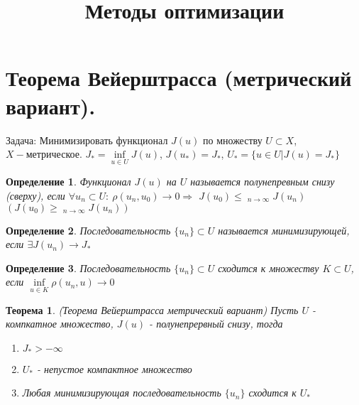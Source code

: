 \documentclass[9pt, a4paper]{extarticle}
\title{Методы оптимизации}
\date{}
\newtheorem*{theorem}{Теорема}
\newtheorem*{definition}{Определение}
\DeclareMathOperator*\lowlim{\underline{lim}}
\DeclareMathOperator*\uplim{\overline{lim}}
\begin{document}
	\maketitle
	\section{Теорема Вейерштрасса (метрический вариант).}
	Задача: Минимизировать функционал $J(u)$ по множеству $U \subset X$, $X - \text{метрическое}$. \newline
	$J_* = \inf\limits_{u \in U} J(u)$, $J(u_*) = J_*$, $U_* = \{u \in U \vert J(u) = J_*\}$
	\begin{definition}
		Функционал $J(u)$ на $U$ называется полунепревным снизу (сверху), если $\forall {u_n} \subset U: \ \rho(u_n, u_0) \to 0  \Rightarrow$ $J(u_0) \leq \lowlim_{n\to\infty} J(u_n)$ $\left( J(u_0) \geq \uplim_{n\to\infty}J(u_n)\right)$
	\end{definition}
	\begin{definition}
		Последовательность $\{u_n\} \subset U$ называется минимизирующей, если $\exists J(u_n) \to J_*$
	\end{definition}
	\begin{definition}
		Последовательность $\{u_n\} \subset U$ сходится к множеству $K \subset U$, если $\inf\limits_{u \in K} \rho(u_n, u) \to 0$
	\end{definition}
	\begin{theorem}
		(Теорема Вейерштрасса метрический вариант)\newline
		 Пусть $U$ - компкатное множество, $J(u)$ - полунепрервный снизу, тогда 
		 \begin{enumerate}
		 	\item $J_* > -\infty$
		 	\item $U_*$ - непустое компактное множество
		 	\item Любая минимизирующая последовательность $\{u_n\}$ сходится к $U_*$
		 \end{enumerate}
	\end{theorem}
\end{document}
